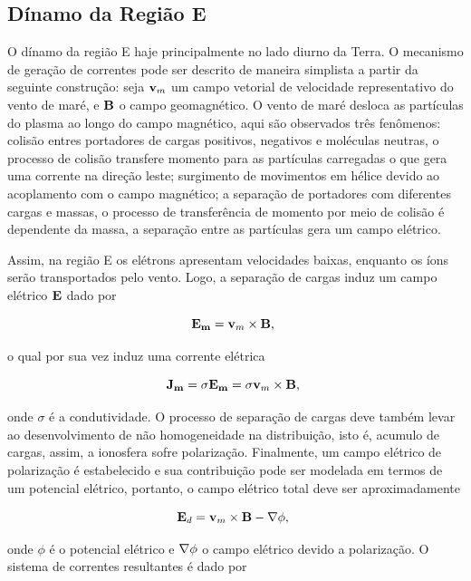 \subsection{Dínamo da Região E} 

O dínamo da região E haje principalmente no lado diurno da Terra. O mecanismo de geração de correntes pode ser descrito de maneira simplista a partir da seguinte construção: seja ${\bf v}_m$ um campo vetorial de velocidade representativo do vento de maré, e ${\bf B}$ o campo geomagnético. O vento de maré desloca as partículas do plasma ao longo do campo magnético, aqui são observados três fenômenos: colisão entres portadores de cargas positivos, negativos e moléculas neutras, o processo de colisão transfere momento para as partículas carregadas o que gera uma corrente na direção leste; surgimento de movimentos em hélice devido ao acoplamento com o campo magnético; a separação de portadores com diferentes cargas e massas, o processo de transferência de momento por meio de colisão é dependente da massa, a separação entre as partículas gera um campo elétrico.

Assim, na região E os elétrons apresentam velocidades baixas, enquanto os íons serão transportados pelo vento. Logo, a separação de cargas induz um campo elétrico ${\bf E}$ dado por 

\begin{equation}
{\bf E_m} = {\bf v}_m\times{\bf B}\mbox{,}~
\end{equation}

o qual por sua vez induz uma corrente elétrica

\begin{equation}
{\bf J_m}=\sigma{\bf E_m} = \sigma{\bf v}_m\times{\bf B}\mbox{,}~
\end{equation}

onde $\sigma$ é a condutividade. O processo de separação de cargas deve também levar ao desenvolvimento de não homogeneidade na distribuição, isto é, acumulo de cargas, assim, a ionosfera sofre polarização. Finalmente, um campo elétrico de polarização é estabelecido e sua contribuição pode ser modelada em termos de um potencial elétrico, portanto, o campo elétrico total deve ser aproximadamente

\begin{equation}
{\bf E}_d = {\bf v}_m\times{\bf B}-{\bf \nabla}\phi\mbox{,}~
\end{equation}

onde $\phi$ é o potencial elétrico e ${\bf \nabla}\phi$ o campo elétrico devido a polarização. O sistema de correntes resultantes é dado por

